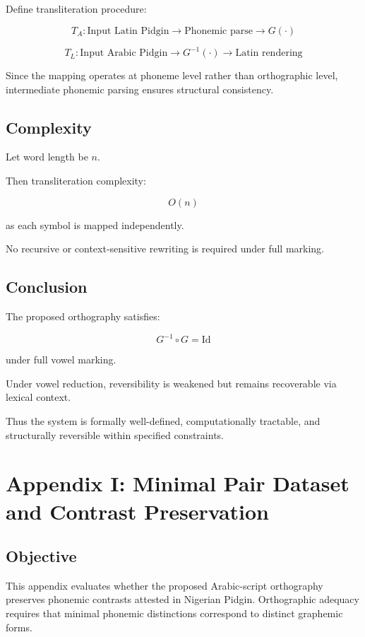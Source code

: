 \documentclass[12pt]{article}
\begin{document}
Define transliteration procedure:

\[
T_A: \text{Input Latin Pidgin} \rightarrow \text{Phonemic parse} \rightarrow G(\cdot)
\]

\[
T_L: \text{Input Arabic Pidgin} \rightarrow G^{-1}(\cdot) \rightarrow \text{Latin rendering}
\]

Since the mapping operates at phoneme level rather than orthographic level, intermediate phonemic parsing ensures structural consistency.

\subsection{Complexity}

Let word length be \( n \).

Then transliteration complexity:

\[
O(n)
\]

as each symbol is mapped independently.

No recursive or context-sensitive rewriting is required under full marking.

\subsection{Conclusion}

The proposed orthography satisfies:

\[
G^{-1} \circ G = \mathrm{Id}
\]

under full vowel marking.

Under vowel reduction, reversibility is weakened but remains recoverable via lexical context.

Thus the system is formally well-defined, computationally tractable, and structurally reversible within specified constraints.

\section{Appendix I: Minimal Pair Dataset and Contrast Preservation}

\subsection{Objective}

This appendix evaluates whether the proposed Arabic-script orthography preserves phonemic contrasts attested in Nigerian Pidgin. Orthographic adequacy requires that minimal phonemic distinctions correspond to distinct graphemic forms.
\end{document}
